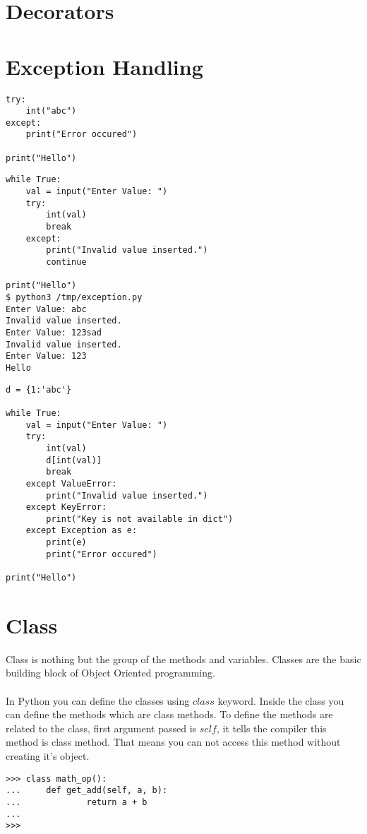 \documentclass[letterpaper,12pt]{book}
\begin{document}
\section{Decorators}

\section{Exception Handling}
\begin{verbatim}
try:
    int("abc")
except:
    print("Error occured")

print("Hello")

\end{verbatim}
\begin{verbatim}
while True:
    val = input("Enter Value: ")
    try:
        int(val)
        break
    except:
        print("Invalid value inserted.")
        continue

print("Hello")
$ python3 /tmp/exception.py
Enter Value: abc
Invalid value inserted.
Enter Value: 123sad
Invalid value inserted.
Enter Value: 123
Hello
\end{verbatim}
\begin{verbatim}
d = {1:'abc'}

while True:
    val = input("Enter Value: ")
    try:
        int(val)
        d[int(val)]
        break
    except ValueError:
        print("Invalid value inserted.")
    except KeyError:
        print("Key is not available in dict")
    except Exception as e:
        print(e)
        print("Error occured")

print("Hello")
\end{verbatim}
\section{Class}
Class is nothing but the group of the methods and variables. Classes are the basic building block of Object Oriented programming. 
\paragraph{}
In Python you can define the classes using $class$ keyword. Inside the class you can define the methods which are class methods. To define the methods are related to the class, first argument passed is $self$, it tells the compiler this method is class method. That means you can not access this method without creating it's object. 

\begin{verbatim}
>>> class math_op():
...     def get_add(self, a, b):
...             return a + b
... 
>>> 
\end{verbatim}
\end{document}
